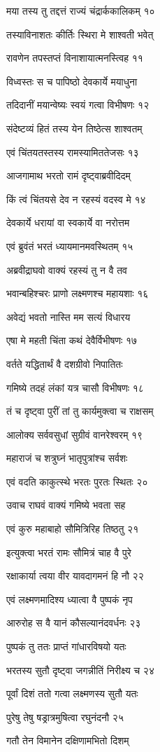 मया तस्य तु तद्दत्तं राज्यं चंद्रार्ककालिकम् १०

तस्याविनाशतः कीर्तिः स्थिरा मे शाश्वती भवेत्

रावणेन तपस्तप्तं विनाशायात्मनस्त्विह ११

विध्वस्तः स च पापिष्ठो देवकार्ये मयाधुना

तदिदानीं मयान्वेष्यः स्वयं गत्वा विभीषणः १२

संदेष्टव्यं हितं तस्य येन तिष्ठेत्स शाश्वतम्

एवं चिंतयतस्तस्य रामस्यामिततेजसः १३

आजगामाथ भरतो रामं दृष्ट्वाब्रवीदिदम्

किं त्वं चिंतयसे देव न रहस्यं वदस्व मे १४

देवकार्ये धरायां वा स्वकार्ये वा नरोत्तम

एवं ब्रुवंतं भरतं ध्यायमानमवस्थितम् १५

अब्रवीद्राघवो वाक्यं रहस्यं तु न वै तव

भवान्बहिश्चरः प्राणो लक्ष्मणश्च महायशाः १६

अवेद्यं भवतो नास्ति मम सत्यं विधारय

एषा मे महती चिंता कथं देवैर्विभीषणः १७

वर्तते यद्धितार्थं वै दशग्रीवो निपातितः

गमिष्ये तदहं लंकां यत्र चासौ विभीषणः १८

तं च दृष्ट्वा पुरीं तां तु कार्यमुक्त्वा च राक्षसम्

आलोक्य सर्ववसुधां सुग्रीवं वानरेश्वरम् १९

महाराजं च शत्रुघ्नं भातृपुत्रांश्च सर्वशः

एवं वदति काकुत्स्थे भरतः पुरतः स्थितः २०

उवाच राघवं वाक्यं गमिष्ये भवता सह

एवं कुरु महाबाहो सौमित्रिरिह तिष्ठतु २१

इत्युक्त्वा भरतं रामः सौमित्रं चाह वै पुरे

रक्षाकार्या त्वया वीर यावदागमनं हि नौ २२

एवं लक्ष्मणमादिश्य ध्यात्वा वै पुष्पकं नृप

आरुरोह स वै यानं कौसल्यानंदवर्धनः २३

पुष्पकं तु ततः प्राप्तं गांधारविषयो यतः

भरतस्य सुतौ दृष्ट्वा जगन्नीतिं निरीक्ष्य च २४

पूर्वां दिशं ततो गत्वा लक्ष्मणस्य सुतौ यतः

पुरेषु तेषु षड्रात्रमुषित्वा रघुनंदनौ २५

गतौ तेन विमानेन दक्षिणामभितो दिशम्

